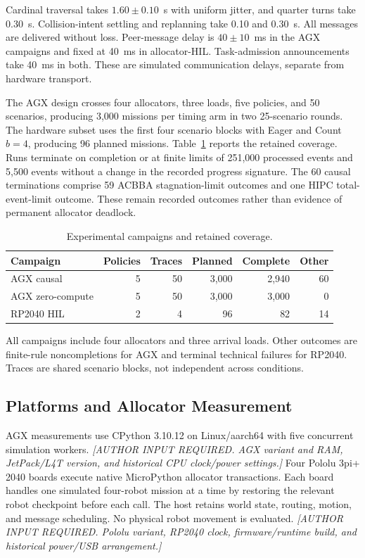 \documentclass[conference]{IEEEtran}
\newcommand{\platformtodo}[1]{\textit{[AUTHOR INPUT REQUIRED. #1]}}
\begin{document}
Cardinal traversal takes $1.60\pm0.10$~s with uniform jitter, and quarter turns take 0.30~s. Collision-intent settling and replanning take 0.10 and 0.30~s. All messages are delivered without loss. Peer-message delay is $40\pm10$~ms in the AGX campaigns and fixed at 40~ms in allocator-HIL. Task-admission announcements take 40~ms in both. These are simulated communication delays, separate from hardware transport.

The AGX design crosses four allocators, three loads, five policies, and 50 scenarios, producing 3,000 missions per timing arm in two 25-scenario rounds. The hardware subset uses the first four scenario blocks with Eager and Count $b=4$, producing 96 planned missions. Table~\ref{tab:campaigns} reports the retained coverage. Runs terminate on completion or at finite limits of 251,000 processed events and 5,500 events without a change in the recorded progress signature. The 60 causal terminations comprise 59 ACBBA stagnation-limit outcomes and one HIPC total-event-limit outcome. These remain recorded outcomes rather than evidence of permanent allocator deadlock.

\begin{table}[t]
\caption{Experimental campaigns and retained coverage.}
\label{tab:campaigns}
\centering
\small
\setlength{\tabcolsep}{3.3pt}
\begin{tabular}{@{}lrrrrr@{}}
\toprule
Campaign & Policies & Traces & Planned & Complete & Other\\
\midrule
AGX causal & 5 & 50 & 3,000 & 2,940 & 60\\
AGX zero-compute & 5 & 50 & 3,000 & 3,000 & 0\\
RP2040 HIL & 2 & 4 & 96 & 82 & 14\\
\bottomrule
\end{tabular}\par
\vspace{3pt}
\noindent\parbox{\columnwidth}{\footnotesize All campaigns include four allocators and three arrival loads. Other outcomes are finite-rule noncompletions for AGX and terminal technical failures for RP2040. Traces are shared scenario blocks, not independent across conditions.}
\end{table}

\subsection{Platforms and Allocator Measurement}
\label{sec:platforms}
AGX measurements use CPython 3.10.12 on Linux/aarch64 with five concurrent simulation workers. \platformtodo{AGX variant and RAM, JetPack/L4T version, and historical CPU clock/power settings.} Four Pololu 3pi+ 2040 boards execute native MicroPython allocator transactions. Each board handles one simulated four-robot mission at a time by restoring the relevant robot checkpoint before each call. The host retains world state, routing, motion, and message scheduling. No physical robot movement is evaluated. \platformtodo{Pololu variant, RP2040 clock, firmware/runtime build, and historical power/USB arrangement.}
\end{document}
